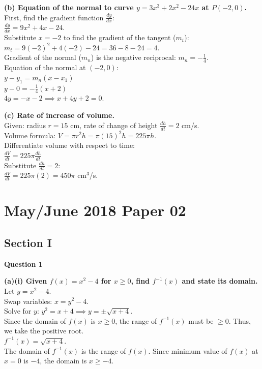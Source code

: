 \documentclass[12pt]{article}
\begin{document}
\textbf{(b) Equation of the normal to curve $y = 3x^3 + 2x^2 - 24x$ at $P(-2, 0)$.} \\
First, find the gradient function $\frac{dy}{dx}$: \\
$\frac{dy}{dx} = 9x^2 + 4x - 24$. \\
Substitute $x = -2$ to find the gradient of the tangent ($m_t$): \\
$m_t = 9(-2)^2 + 4(-2) - 24 = 36 - 8 - 24 = 4$. \\
Gradient of the normal ($m_n$) is the negative reciprocal: $m_n = -\frac{1}{4}$. \\
Equation of the normal at $(-2, 0)$: \\
$y - y_1 = m_n(x - x_1)$ \\
$y - 0 = -\frac{1}{4}(x + 2)$ \\
$4y = -x - 2 \implies x + 4y + 2 = 0$.

\textbf{(c) Rate of increase of volume.} \\
Given: radius $r = 15$ cm, rate of change of height $\frac{dh}{dt} = 2$ cm/s. \\
Volume formula: $V = \pi r^2 h = \pi(15)^2 h = 225\pi h$. \\
Differentiate volume with respect to time: \\
$\frac{dV}{dt} = 225\pi \frac{dh}{dt}$ \\
Substitute $\frac{dh}{dt} = 2$: \\
$\frac{dV}{dt} = 225\pi(2) = 450\pi$ cm$^3$/s.

\newpage
\section{May/June 2018 Paper 02}

\subsection*{Section I}

\textbf{Question 1}

\textbf{(a)(i) Given $f(x) = x^2 - 4$ for $x \geq 0$, find $f^{-1}(x)$ and state its domain.} \\
Let $y = x^2 - 4$. \\
Swap variables: $x = y^2 - 4$. \\
Solve for $y$: $y^2 = x + 4 \implies y = \pm\sqrt{x+4}$. \\
Since the domain of $f(x)$ is $x \geq 0$, the range of $f^{-1}(x)$ must be $\geq 0$. Thus, we take the positive root. \\
$f^{-1}(x) = \sqrt{x+4}$. \\
The domain of $f^{-1}(x)$ is the range of $f(x)$. Since minimum value of $f(x)$ at $x=0$ is $-4$, the domain is $x \geq -4$.
\end{document}
